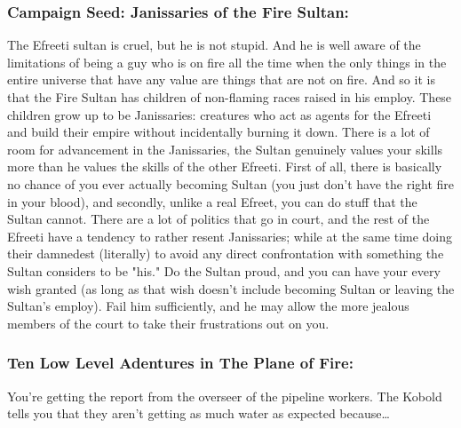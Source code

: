 \subsubsection{Campaign Seed: Janissaries of the Fire Sultan:} The Efreeti sultan is cruel, but he is not stupid. And he is well aware of the limitations of being a guy who is on fire all the time when the only things in the entire universe that have any value are things that are not on fire. And so it is that the Fire Sultan has children of non-flaming races raised in his employ. These children grow up to be Janissaries: creatures who act as agents for the Efreeti and build their empire without incidentally burning it down. There is a lot of room for advancement in the Janissaries, the Sultan genuinely values your skills more than he values the skills of the other Efreeti. First of all, there is basically no chance of you ever actually becoming Sultan (you just don't have the right fire in your blood), and secondly, unlike a real Efreet, you can do stuff that the Sultan cannot. There are a lot of politics that go in court, and the rest of the Efreeti have a tendency to rather resent Janissaries; while at the same time doing their damnedest (literally) to avoid any direct confrontation with something the Sultan considers to be "his." Do the Sultan proud, and you can have your every wish granted (as long as that wish doesn't include becoming Sultan or leaving the Sultan's employ). Fail him sufficiently, and he may allow the more jealous members of the court to take their frustrations out on you.

\subsubsection{Ten Low Level Adentures in The Plane of Fire:}

You're getting the report from the overseer of the pipeline workers. The Kobold tells you that they aren't getting as much water as expected because\ldots

